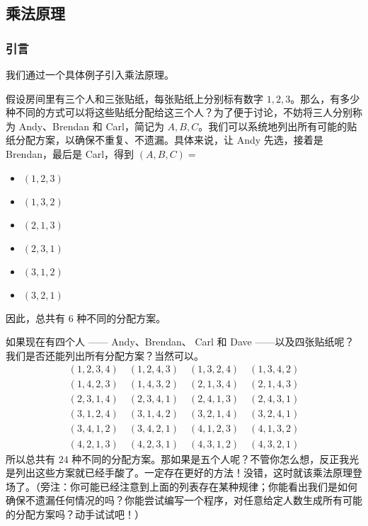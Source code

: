 
\subsection{乘法原理}

\subsubsection*{引言}

我们通过一个具体例子引入乘法原理。

\begin{example}
    假设房间里有三个人和三张贴纸，每张贴纸上分别标有数字 $1, 2, 3$。那么，有多少种不同的方式可以将这些贴纸分配给这三个人？为了便于讨论，不妨将三人分别称为 Andy、Brendan 和 Carl，简记为 $A, B, C$。我们可以系统地列出所有可能的贴纸分配方案，以确保不重复、不遗漏。具体来说，让 Andy 先选，接着是 Brendan，最后是 Carl，得到 $(A, B, C) = $
    \begin{itemize}
        \item $(1, 2, 3)$
        \item $(1, 3, 2)$
        \item $(2, 1, 3)$
        \item $(2, 3, 1)$
        \item $(3, 1, 2)$
        \item $(3, 2, 1)$
    \end{itemize}
    因此，总共有 $6$ 种不同的分配方案。

    如果现在有四个人 —— Andy、Brendan、 Carl 和 Dave ——以及四张贴纸呢？我们是否还能列出所有分配方案？当然可以。
    \begin{align*}
        (1, 2, 3, 4) \quad (1, 2, 4, 3) \quad (1, 3, 2, 4) \quad (1, 3, 4, 2) \\
        (1, 4, 2, 3) \quad (1, 4, 3, 2) \quad (2, 1, 3, 4) \quad (2, 1, 4, 3) \\
        (2, 3, 1, 4) \quad (2, 3, 4, 1) \quad (2, 4, 1, 3) \quad (2, 4, 3, 1) \\
        (3, 1, 2, 4) \quad (3, 1, 4, 2) \quad (3, 2, 1, 4) \quad (3, 2, 4, 1) \\
        (3, 4, 1, 2) \quad (3, 4, 2, 1) \quad (4, 1, 2, 3) \quad (4, 1, 3, 2) \\
        (4, 2, 1, 3) \quad (4, 2, 3, 1) \quad (4, 3, 1, 2) \quad (4, 3, 2, 1)
    \end{align*}
    所以总共有 $24$ 种不同的分配方案。那如果是五个人呢？不管你怎么想，反正我光是列出这些方案就已经手酸了。一定存在更好的方法！没错，这时就该乘法原理登场了。（旁注：你可能已经注意到上面的列表存在某种规律；你能看出我们是如何确保不遗漏任何情况的吗？你能尝试编写一个程序，对任意给定人数生成所有可能的分配方案吗？动手试试吧！）
\end{example}

